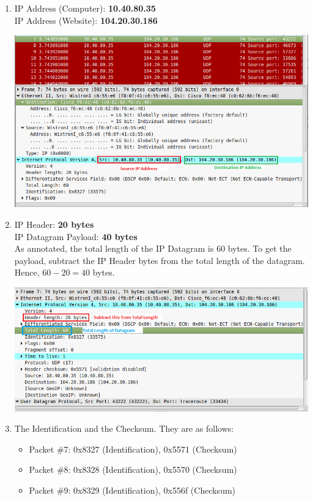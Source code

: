 \documentclass[11pt]{article}
\begin{document}
\begin{enumerate}
\item
IP Address (Computer): \textbf{10.40.80.35} \\
IP Address (Website): \textbf{104.20.30.186}
\begin{center}
\includegraphics[scale=0.4]{Q3}
\end{center}

\item
IP Header: \textbf{20 bytes} \\
IP Datagram Payload: \textbf{40 bytes} \\
As annotated, the total length of the IP Datagram is 60 bytes. To get the payload, subtract the IP Header bytes from the total length of the datagram. Hence, $60 - 20 = 40$ bytes.
\begin{center}
\includegraphics[scale=0.4]{Q4}
\end{center}

\item
The Identification and the Checksum. They are as follows:
\begin{itemize}
\item{Packet \#7: 0x8327 (Identification), 0x5571 (Checksum)}
\item{Packet \#8: 0x8328 (Identification), 0x5570 (Checksum)}
\item{Packet \#9: 0x8329 (Identification), 0x556f (Checksum)}
\end{itemize}


\end{enumerate}
\end{document}
